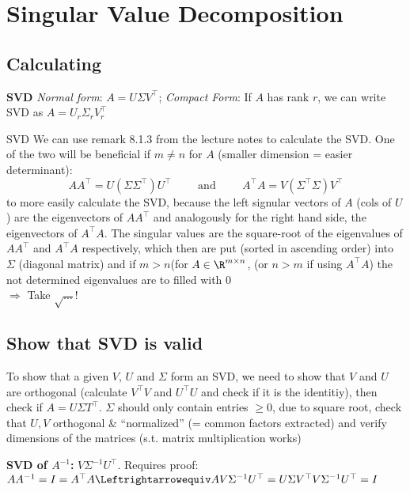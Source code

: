 \newsection
\section{Singular Value Decomposition}

\subsection{Calculating}
\shortdef \textbf{SVD} \textit{Normal form}: $A = U\Sigma V^{\top}$;
\textit{Compact Form}: If $A$ has rank $r$, we can write SVD as $A = U_r\Sigma_rV_r^{\top}$

\begin{usage}[]{SVD}
    We can use remark 8.1.3 from the lecture notes to calculate the SVD. One of the two will be beneficial if $m \neq n$ for $A$ (smaller dimension = easier determinant):
    \[
        AA^{\top} = U(\Sigma \Sigma^{\top})U^{\top} \hspace{1cm} \text{and} \hspace{1cm} A^{\top}A = V(\Sigma^{\top}\Sigma)V^{\top}
    \]
    to more easily calculate the SVD, because the left signular vectors of $A$ (cols of $U$) are the eigenvectors of $AA^{\top}$ and analogously for the right hand side, the eigenvectors of $A^{\top}A$. The singular values are the square-root of the eigenvalues of $AA^{\top}$ and $A^{\top}A$ respectively, which then are put (sorted in ascending order) into $\Sigma$ (diagonal matrix) and if $m > n$(for $A \in \R^{m \times n}$, (or $n > m$ if using $A^{\top}A$) the not determined eigenvalues are to filled with $0$\\ $\Longrightarrow$  Take $\sqrt{\ldots}$!
\end{usage}

\subsection{Show that SVD is valid}
To show that a given $V$, $U$ and $\Sigma$ form an SVD, we need to show that $V$ and $U$ are orthogonal (calculate $V^{\top}V$ and $U^{\top}U$ and check if it is the identitiy), then check if $A = U\Sigma T^{\top}$.
 $\Sigma$ should only contain entries $\geq 0$, due to square root, check that $U, V$ orthogonal \& ``normalized'' (= common factors extracted) and verify dimensions of the matrices (s.t. matrix multiplication works)

\textbf{SVD of $A^{-1}$:} $V\Sigma^{-1}U^{\top}$. Requires proof: $AA^{-1} = I = A^{\top}A \Leftrightarrowequiv AV\Sigma^{-1}U^{\top} = U\Sigma V^{\top}V\Sigma^{-1}U^{\top} = I$

